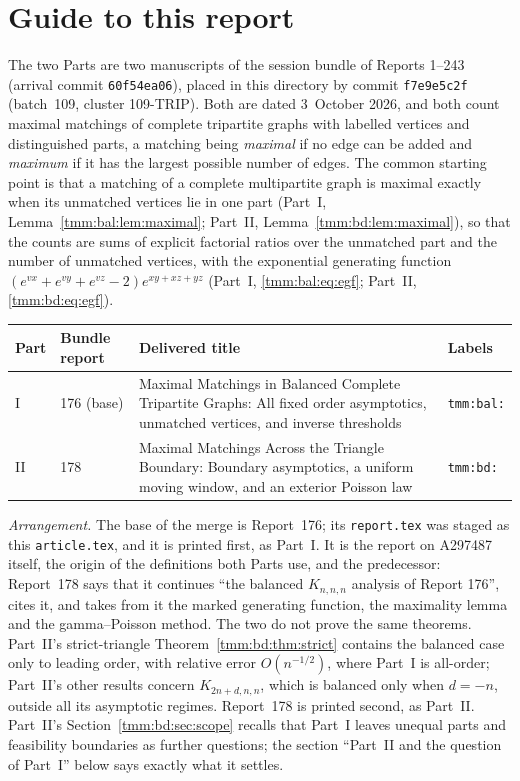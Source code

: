 \documentclass[11pt,letterpaper]{article}
\theoremstyle{remark}\newtheorem{remark}[theorem]{Remark}
\newcommand{\file}[1]{\nolinkurl{#1}}
\begin{document}
\section*{Guide to this report}\label{tmm:sec:guide}
The two Parts are two manuscripts of the session bundle of Reports 1--243 (arrival commit \texttt{60f54ea06}), placed in this directory by commit \texttt{f7e9e5c2f} (batch~109, cluster 109-TRIP). Both are dated 3~October 2026, and both count maximal matchings of complete tripartite graphs with labelled vertices and distinguished parts, a matching being \emph{maximal} if no edge can be added and \emph{maximum} if it has the largest possible number of edges. The common starting point is that a matching of a complete multipartite graph is maximal exactly when its unmatched vertices lie in one part (Part~I, Lemma~\ref{tmm:bal:lem:maximal}; Part~II, Lemma~\ref{tmm:bd:lem:maximal}), so that the counts are sums of explicit factorial ratios over the unmatched part and the number of unmatched vertices, with the exponential generating function $(e^{vx}+e^{vy}+e^{vz}-2)e^{xy+xz+yz}$ (Part~I, \eqref{tmm:bal:eq:egf}; Part~II, \eqref{tmm:bd:eq:egf}).
\begin{center}
\small
\begin{tabular}{@{}l l >{\raggedright\arraybackslash}p{} l@{}}
\toprule
Part & Bundle report & Delivered title & Labels\\
\midrule
I & 176 (base) & Maximal Matchings in Balanced Complete Tripartite Graphs: All fixed order asymptotics, unmatched vertices, and inverse thresholds & \texttt{tmm:bal:}\\
II & 178 & Maximal Matchings Across the Triangle Boundary: Boundary asymptotics, a uniform moving window, and an exterior Poisson law & \texttt{tmm:bd:}\\
\bottomrule
\end{tabular}
\end{center}
\emph{Arrangement.} The base of the merge is Report~176; its \file{report.tex} was staged as this \file{article.tex}, and it is printed first, as Part~I. It is the report on A297487 itself, the origin of the definitions both Parts use, and the predecessor: Report~178 says that it continues ``the balanced $K_{n,n,n}$ analysis of Report 176'', cites it, and takes from it the marked generating function, the maximality lemma and the gamma--Poisson method. The two do not prove the same theorems. Part~II's strict-triangle Theorem~\ref{tmm:bd:thm:strict} contains the balanced case only to leading order, with relative error $O(n^{-1/2})$, where Part~I is all-order; Part~II's other results concern $K_{2n+d,n,n}$, which is balanced only when $d=-n$, outside all its asymptotic regimes. Report~178 is printed second, as Part~II. Part~II's Section~\ref{tmm:bd:sec:scope} recalls that Part~I leaves unequal parts and feasibility boundaries as further questions; the section ``Part~II and the question of Part~I'' below says exactly what it settles.
\end{document}
